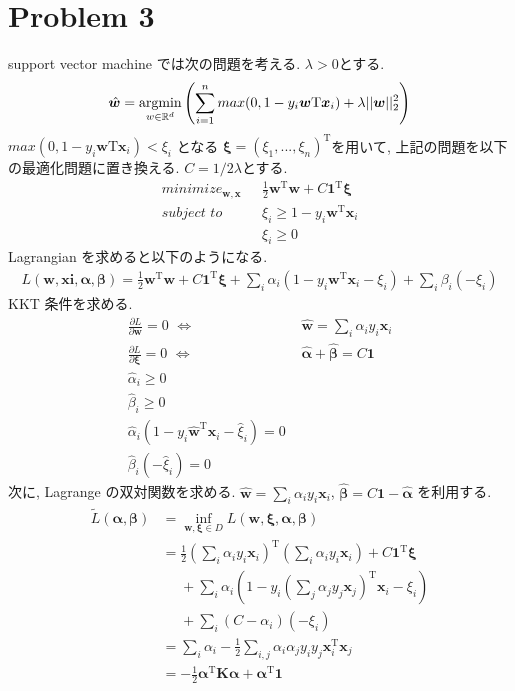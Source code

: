 \documentclass[a4paper,10pt]{jsarticle}
\newcommand{\argmin}{\mathop{\rm argmin}\limits}
\begin{document}
\section*{Problem 3}
support vector machine では次の問題を考える. $\lambda > 0$とする.
\begin{equation}
 \hat{\bm{w}} = \argmin_{w \in \mathbb{R}^d}
  \left(\sum_{i=1}^{n}max(0, 1 - y_i\bm{w}\mathrm{T}\bm{x}_i)
   + \lambda||\bm{w}||^2_2 \right)
\end{equation}
$max(0, 1 - y_i\bm{w}\mathrm{T}\bm{x}_i) < \xi_i$ となる
$\bm{\xi} = (\xi_1, ..., \xi_n)^\mathrm{T}$を用いて,
上記の問題を以下の最適化問題に置き換える.
$C=1/2\lambda$とする.
\begin{align*}
 minimize_{\bm{w}, \bm{x}} \,\,\,\,
 & \frac{1}{2}\bm{w}^\mathrm{T}\bm{w} + C\bm{1}^\mathrm{T}\bm{\xi}\\
 subject \,\, to \,\,\,\, &\xi_i \geq 1 - y_i\bm{w}^\mathrm{T}\bm{x}_i\\
 &\xi_i \geq 0
\end{align*}
Lagrangian を求めると以下のようになる.
\begin{align*}
 L(\bm{w}, \bm{xi}, \bm{\alpha}, \bm{\beta})
 = \frac{1}{2}\bm{w}^\mathrm{T}\bm{w} + C\bm{1}^\mathrm{T}\bm{\xi}
 + \sum_{i}\alpha_i(1 - y_i\bm{w}^\mathrm{T}\bm{x}_i - \xi_i)
 + \sum_{i}\beta_i(-\xi_i)
\end{align*}
KKT 条件を求める.
\begin{align*}
 \frac{\partial L}{\partial \bm{w}} = 0 \,\, \Longleftrightarrow
 &\,\,\hat{\bm{w}} = \sum_{i}\alpha_iy_i\bm{x}_i\\
 \frac{\partial L}{\partial \bm{\xi}} = 0 \,\, \Longleftrightarrow
 &\,\,\hat{\bm{\alpha}} + \hat{\bm{\beta}} = C\bm{1}\\
 \hat{\alpha}_i \geq 0\\
 \hat{\beta}_i \geq 0\\
 \hat{\alpha}_i(1 - y_i\hat{\bm{w}}^\mathrm{T}\bm{x}_i - \hat{\xi}_i) = 0\\
 \hat{\beta}_i(- \hat{\xi}_i) = 0
\end{align*}
次に, Lagrange の双対関数を求める.
$\hat{\bm{w}}=\sum_{i}\alpha_iy_i\bm{x}_i$,
$\hat{\bm{\beta}} = C\bm{1} - \hat{\bm{\alpha}}$
を利用する.
\begin{align*}
 \tilde{L}(\bm{\alpha}, \bm{\beta})
 & = \inf_{\bm{w}, \bm{\xi} \in D}L(\bm{w}, \bm{\xi}, \bm{\alpha}, \bm{\beta})\\
 & = \frac{1}{2}\left(\sum_{i}\alpha_iy_i\bm{x}_i\right)^\mathrm{T}
 \left(\sum_{i}\alpha_iy_i\bm{x}_i\right)
 + C\bm{1}^\mathrm{T}\bm{\xi}\\
 &\,\,\,\,\,\,\,\,+ \sum_{i}\alpha_i\left(1 - y_i
 \left(\sum_{j}\alpha_jy_j\bm{x}_j\right)^\mathrm{T}\bm{x}_i-\xi_i\right)\\
 &\,\,\,\,\,\,\,\,+ \sum_i(C - \alpha_i)(-\xi_i)\\
 & = \sum_i\alpha_i - \frac{1}{2}\sum_{i,j}\alpha_i\alpha_jy_iy_j
 \bm{x}^\mathrm{T}_i\bm{x}_j\\
 & = -\frac{1}{2}\bm{\alpha}^\mathrm{T}\bm{K}\mathrm{\bm{\alpha}}
 + \bm{\alpha}^\mathrm{T}\bm{1}
\end{align*}
\end{document}
